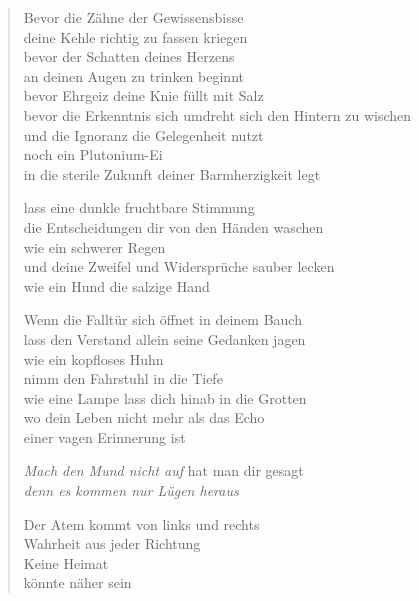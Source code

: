 
\cleartoverso


\begin{verse}

Bevor die Zähne der Gewissensbisse\\
deine Kehle richtig zu fassen kriegen\\
bevor der Schatten deines Herzens\\
an deinen Augen zu trinken beginnt\\
bevor Ehrgeiz deine Knie füllt mit Salz\\
bevor die Erkenntnis sich umdreht sich den Hintern zu wischen\\
und die Ignoranz die Gelegenheit nutzt\\
noch ein Plutonium-Ei\\
in die sterile Zukunft deiner Barmherzigkeit legt

lass eine dunkle fruchtbare Stimmung\\
die Entscheidungen dir von den Händen waschen\\
wie ein schwerer Regen\\
und deine Zweifel und Widersprüche sauber lecken\\
wie ein Hund die salzige Hand

Wenn die Falltür sich öffnet in deinem Bauch\\
lass den Verstand allein seine Gedanken jagen\\
wie ein kopfloses Huhn\\
nimm den Fahrstuhl in die Tiefe\\
wie eine Lampe lass dich hinab in die Grotten\\
wo dein Leben nicht mehr als das Echo\\
einer vagen Erinnerung ist

\emph{Mach den Mund nicht auf} hat man dir gesagt\\
\emph{denn es kommen nur Lügen heraus}

Der Atem kommt von links und rechts\\
Wahrheit aus jeder Richtung\\
Keine Heimat\\
könnte näher sein

\end{verse}

\clearpage


